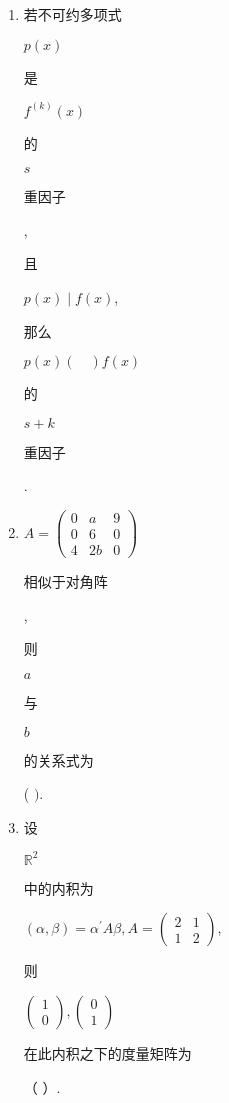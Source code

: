 \documentclass[10pt]{article}
\begin{document}
\begin{enumerate}
  \item \begin{CJK}{UTF8}{mj}若不可约多项式\end{CJK} $p(x)$ \begin{CJK}{UTF8}{mj}是\end{CJK} $f^{(k)}(x)$ \begin{CJK}{UTF8}{mj}的\end{CJK} $s$ \begin{CJK}{UTF8}{mj}重因子\end{CJK}, \begin{CJK}{UTF8}{mj}且\end{CJK} $p(x) \mid f(x)$, \begin{CJK}{UTF8}{mj}那么\end{CJK} $p(x)(\quad) f(x)$ \begin{CJK}{UTF8}{mj}的\end{CJK} $s+k$ \begin{CJK}{UTF8}{mj}重因子\end{CJK}.

  \item $A=\left(\begin{array}{ccc}0 & a & 9 \\ 0 & 6 & 0 \\ 4 & 2 b & 0\end{array}\right)$ \begin{CJK}{UTF8}{mj}相似于对角阵\end{CJK}, \begin{CJK}{UTF8}{mj}则\end{CJK} $a$ \begin{CJK}{UTF8}{mj}与\end{CJK} $b$ \begin{CJK}{UTF8}{mj}的关系式为\end{CJK} ( $)$.

  \item \begin{CJK}{UTF8}{mj}设\end{CJK} $\mathbb{R}^{2}$ \begin{CJK}{UTF8}{mj}中的内积为\end{CJK} $(\alpha, \beta)=\alpha^{\prime} A \beta, A=\left(\begin{array}{ll}2 & 1 \\ 1 & 2\end{array}\right)$, \begin{CJK}{UTF8}{mj}则\end{CJK} $\left(\begin{array}{l}1 \\ 0\end{array}\right),\left(\begin{array}{l}0 \\ 1\end{array}\right)$ \begin{CJK}{UTF8}{mj}在此内积之下的度量矩阵为\end{CJK}（ ）.


\end{enumerate}
\end{document}
